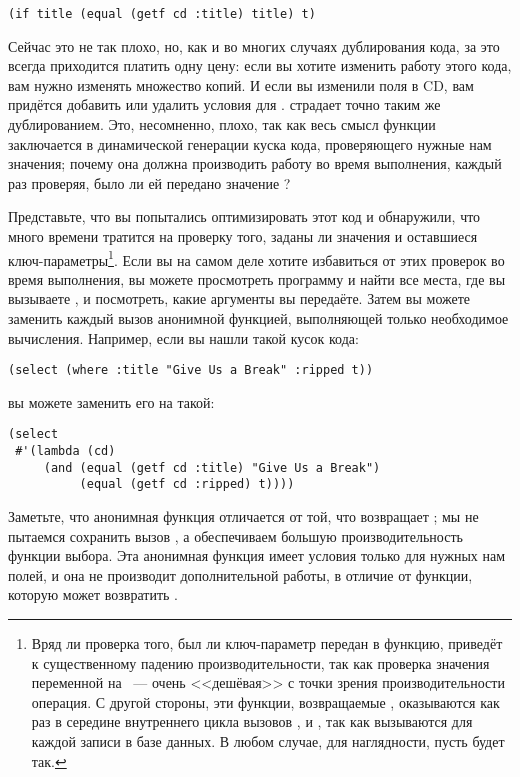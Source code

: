 \begin{lstlisting}
(if title (equal (getf cd :title) title) t)
\end{lstlisting}

Сейчас это не так плохо, но, как и во многих случаях дублирования кода, за это всегда
приходится платить одну цену: если вы хотите изменить работу этого кода, вам нужно
изменять множество копий. И если вы изменили поля в CD, вам придётся добавить или удалить
условия для .  страдает точно таким же дублированием. Это,
несомненно, плохо, так как весь смысл функции  заключается в динамической
генерации куска кода, проверяющего нужные нам значения; почему она должна производить
работу во время выполнения, каждый раз проверяя, было ли ей передано значение
?

Представьте, что вы попытались оптимизировать этот код и обнаружили, что много времени
тратится на проверку того, заданы ли значения  и оставшиеся
ключ-параметры\footnote{Вряд ли проверка того, был ли ключ-параметр передан в функцию,
  приведёт к существенному падению производительности, так как проверка значения
  переменной на ~--- очень <<дешёвая>> с точки зрения производительности операция. С
  другой стороны, эти функции, возвращаемые , оказываются как раз в середине
  внутреннего цикла вызовов ,  и , так как
  вызываются для каждой записи в базе данных. В любом случае, для наглядности, пусть будет
  так.}. Если вы на самом деле хотите избавиться от этих проверок во время выполнения, вы
можете просмотреть программу и найти все места, где вы вызываете , и
посмотреть, какие аргументы вы передаёте. Затем вы можете заменить каждый вызов
 анонимной функцией, выполняющей только необходимое вычисления. Например, если
вы нашли такой кусок кода:

\begin{lstlisting}
(select (where :title "Give Us a Break" :ripped t))
\end{lstlisting}

вы можете заменить его на такой:

\begin{lstlisting}
(select
 #'(lambda (cd)
     (and (equal (getf cd :title) "Give Us a Break")
          (equal (getf cd :ripped) t))))
\end{lstlisting}

Заметьте, что анонимная функция отличается от той, что возвращает ; мы не
пытаемся сохранить вызов , а обеспечиваем большую производительность функции
выбора. Эта анонимная функция имеет условия только для нужных нам полей, и она не
производит дополнительной работы, в отличие от функции, которую может возвратить
.


